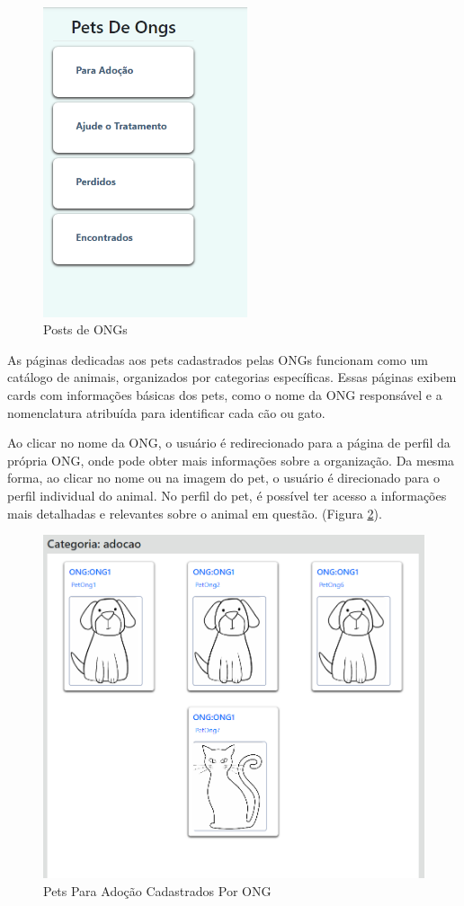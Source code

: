 \begin{figure}[htb]
     \centering
     \includegraphics[width=6cm]{arquivos/Figuras/postong.png}
     \caption{Posts de ONGs}
         \label{fig:PostOng}
\end{figure}

As páginas dedicadas aos pets cadastrados pelas ONGs funcionam como um catálogo de animais, organizados por categorias específicas. Essas páginas exibem cards com informações básicas dos pets, como o nome da ONG responsável e a nomenclatura atribuída para identificar cada cão ou gato.

Ao clicar no nome da ONG, o usuário é redirecionado para a página de perfil da própria ONG, onde pode obter mais informações sobre a organização. Da mesma forma, ao clicar no nome ou na imagem do pet, o usuário é direcionado para o perfil individual do animal. No perfil do pet, é possível ter acesso a informações mais detalhadas e relevantes sobre o animal em questão. (Figura \ref{fig:petsDeOngs}).
\begin{figure}[htb]
     \centering
     \includegraphics[width=14cm]{arquivos/Figuras/petscategoriaadocao.png}
     \caption{Pets Para Adoção Cadastrados Por ONG}
         \label{fig:petsDeOngs}
\end{figure}

